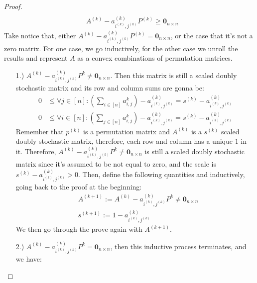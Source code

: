 \documentclass[]{article}
\theoremstyle{definition}
\begin{document}
\begin{proof}
\begin{align}
                \\
                & A^{(k)} - a^{(k)}_{i^{(k)}, j^{(k)}}P^{(k)} \ge \mathbf 0_{n\times n}
            \end{align}
            Take notice that, either $A^{(k)} - a^{(k)}_{i^{(k)}, j^{(k)}}P^{(k)} = \mathbf 0_{n\times n}$, or the case that it's not a zero matrix. For one case, we go inductively, for the other case we unroll the results and represent $A$ as a convex combinations of permutation matrices. 
            \begin{itemize}
                \item [1.)] $A^{(k)} - a^{(k)}_{i^{(k)}, j^{(k)}}P^{k} \neq \mathbf 0_{n\times n}$. Then this matrix is still a scaled doubly stochastic matrix and its row and column sums are gonna be: 
                \begin{align}
                    0 & \le\forall j \in [n]: 
                        \left(
                            \sum_{i \in [n]}^{} 
                            a^{k}_{i, j}
                        \right) - a^{(k)}_{i^{(k)}, j^{(k)}} 
                        = s^{(k)} - a^{(k)}_{i^{(k)}, j^{(k)}} 
                        \\
                    0 & \le \forall i \in [n]: 
                    \left(
                        \sum_{j \in [n]}^{} 
                        a^{k}_{i, j}
                    \right) - a^{(k)}_{i^{(k)}, j^{(k)}} 
                    = s^{(k)} - a^{(k)}_{i^{(k)}, j^{(k)}} 
                \end{align}
                Remember that $p^{(k)}$ is a permutation matrix and $A^{(k)}$ is a $s^{(k)}$ scaled doubly stochastic matrix, therefore, each row and column has a unique $1$ in it. Therefore, $A^{(k)} - a^{(k)}_{i^{(k)}, j^{(k)}}P^{k} \neq \mathbf 0_{n\times n}$ is still a scaled doubly stochastic matrix since it's assumed to be not equal to zero, and the scale is $s^{(k)} - a^{(k)}_{i^{(k)}, j^{(k)}}> 0$. Then, define the following quantities and inductively, going back to the proof at the beginning: 
                \begin{align}
                    & 
                    A^{(k + 1)}:= A^{(k)} - a^{(k)}_{i^{(k)}, j^{(k)}}P^{k} \neq \mathbf 0_{n\times n}
                    \\
                    & s^{(k + 1)} := 1 - a^{(k)}_{i^{(k)}, j^{(k)}}
                \end{align}
                We then go through the prove again with $A^{(k + 1)}$. 
                \item [2.)] $A^{(k)} - a^{(k)}_{i^{(k)}, j^{(k)}}P^{k} = \mathbf 0_{n\times n}$, then this inductive process terminates, and we have: 

\end{itemize}
\end{proof}
\end{document}

